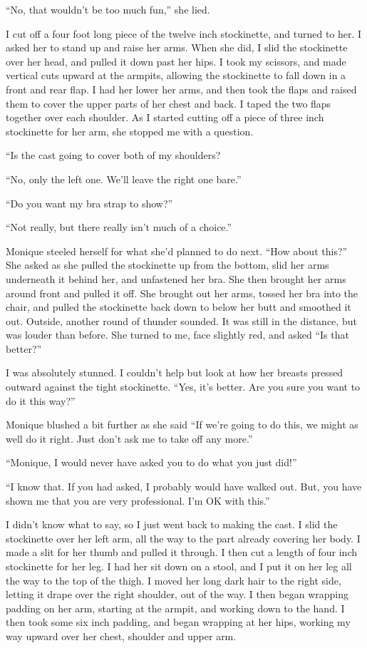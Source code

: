 ``No, that wouldn't be too much fun,'' she lied. 

I cut off a four foot long piece of the twelve inch stockinette, and turned to her. I
asked her to stand up and raise her arms. When she did, I slid the stockinette over her head,
and pulled it down past her hips. I took my scissors, and made vertical cuts upward at the
armpits, allowing the stockinette to fall down in a front and rear flap. I had her lower her
arms, and then took the flaps and raised them to cover the upper parts of her chest and back. I
taped the two flaps together over each shoulder. As I started cutting off a piece of three inch
stockinette for her arm, she stopped me with a question.

``Is the cast going to cover both of my shoulders?

``No, only the left one. We'll leave the right one bare.''

``Do you want my bra strap to show?''

``Not really, but there really isn't much of a choice.''

Monique steeled herself for what she'd planned to do next. ``How about this?'' She asked
as she pulled the stockinette up from the bottom, slid her arms underneath it behind her, and
unfastened her bra. She then brought her arms around front and pulled it off. She brought out
her arms, tossed her bra into the chair, and pulled the stockinette back down to below her butt
and smoothed it out. Outside, another round of thunder sounded. It was still in the distance,
but was louder than before. She turned to me, face slightly red, and asked ``Is that better?''

I was absolutely stunned. I couldn't help but look at how her breasts pressed outward
against the tight stockinette. ``Yes, it's better. Are you sure you want to do it this way?''

Monique blushed a bit further as she said ``If we're going to do this, we might as well do
it right. Just don't ask me to take off any more.''

``Monique, I would never have asked you to do what you just did!''

``I know that. If you had asked, I probably would have walked out. But, you have shown me
that you are very professional. I'm OK with this.''

I didn't know what to say, so I just went back to making the cast. I slid the stockinette
over her left arm, all the way to the part already covering her body. I made a slit for her
thumb and pulled it through. I then cut a length of four inch stockinette for her leg. I had her
sit down on a stool, and I put it on her leg all the way to the top of the thigh. I moved her
long dark hair to the right side, letting it drape over the right shoulder, out of the way. I
then began wrapping padding on her arm, starting at the armpit, and working down to the hand. I
then took some six inch padding, and began wrapping at her hips, working my way upward over her
chest, shoulder and upper arm.

